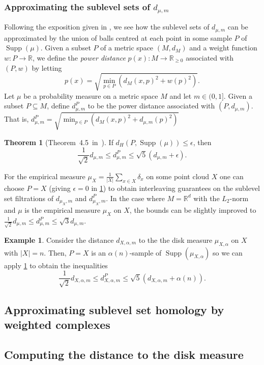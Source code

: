 \documentclass[10pt,a4paper]{article}
\theoremstyle{definition}
\newtheorem{thm}{Theorem}[section]
\newtheorem{ex}{Example}[thm]
\newcommand{\R}{\mathbb{R}}
\begin{document}
	\subsubsection{Approximating the sublevel sets of $d_{\mu,m}$}
 	Following the exposition given in \autocite{Buchet2013}, we see how the sublevel sets of $d_{\mu,m}$ can be approximated by the union of balls centred at each point in some sample $P$ of $\operatorname{Supp}(\mu)$. Given a subset $P$ of a metric space $(M, d_M)$ and a weight function $w\colon P\to\R$, we define the \textit{power distance} $p(x)\colon M\to\R_{\geq0}$ associated with $(P,w)$ by letting
 	$$
 	p(x)=\sqrt{\min_{p\in P}\left(d_M(x,p)^2+w(p)^2\right)}.
 	$$
 	Let $\mu$ be a probability measure on a metric space $M$ and let $m\in(0,1]$. Given a subset $P\subseteq M$, define $d_{\mu,m}^P$ to be the power distance associated with $(P,d_{\mu,m})$. That is, $d_{\mu,m}^P=\sqrt{\min_{p\in P}\left(d_M(x,p)^2+d_{\mu,m}(p)^2\right)}$
 	\begin{thm}[Theorem~4.5~in~\autocite{Buchet2013}]
 		\label{thm_power_distance_dtm_inequality}
 		If $d_H(P,\operatorname{Supp}(\mu))\leq\epsilon$, then $$\frac{1}{\sqrt{2}}d_{\mu,m}\leq d_{\mu,m}^P \leq \sqrt{5}(d_{\mu,m}+\epsilon).$$
 	\end{thm}
 	For the empirical measure $\mu_X = \frac{1}{|X|}\sum_{x\in X}\delta_x$ on some point cloud $X$ one can choose $P=X$ (giving $\epsilon=0$ in \cref{thm_power_distance_dtm_inequality}) to obtain interleaving guarantees on the sublevel set filtrations of $d_{\mu_X,m}$ and $d_{\mu_X,m}^P$. In the case where $M=\R^d$ with the $L_2$-norm and $\mu$ is the empirical measure $\mu_X$ on $X$, the bounds can be slightly improved to $\frac{1}{\sqrt{2}}d_{\mu,m}\leq d_{\mu,m}^P \leq \sqrt{3}d_{\mu,m}$.

	\begin{ex}
		Consider the distance $d_{X,\alpha, m}$ to the the disk measure $\mu_{X,\alpha}$ on $X$ with $|X|=n$. Then, $P=X$ is an $\alpha(n)$-sample of $\operatorname{Supp}(\mu_{X,\alpha})$ so we can apply \cref{thm_power_distance_dtm_inequality} to obtain the inequalities
		$$
		\frac{1}{\sqrt{2}}d_{X,\alpha, m}\leq d_{X,\alpha, m}^P \leq \sqrt{5}(d_{X,\alpha, m}+\alpha(n)).
		$$
	\end{ex}


	\subsection{Approximating sublevel set homology by weighted complexes}
	
	\subsection{Computing the distance to the disk measure}

	\printbibliography
	
\end{document}
